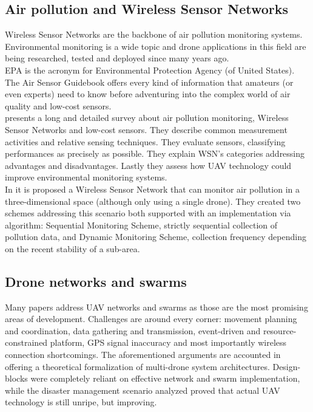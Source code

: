 \documentclass[journal]{IEEEtran}
\begin{document}
\subsection{Air pollution and Wireless Sensor Networks}
Wireless Sensor Networks are the backbone of air pollution monitoring systems. Environmental monitoring is a wide topic and drone applications in this field are being researched, tested and deployed since many years ago.
\\
EPA\cite{epa} is the acronym for Environmental Protection Agency (of United States). The Air Sensor Guidebook \cite{epaguide} offers every kind of information that amateurs (or even experts) need to know before adventuring into the complex world of air quality and low-cost sensors.
\\
\cite{wsnsurvey} presents a long and detailed survey about air pollution monitoring, Wireless Sensor Networks and low-cost sensors. They describe common measurement activities and relative sensing techniques. They evaluate sensors, classifying performances as precisely as possible. They explain WSN's categories addressing advantages and disadvantages. Lastly they assess how UAV technology could improve environmental monitoring systems.
\\
In \cite{airwise} it is proposed a Wireless Sensor Network that can monitor air pollution in a three-dimensional space (although only using a single drone). They created two schemes addressing this scenario both supported with an implementation via algorithm: Sequential Monitoring Scheme, strictly sequential collection of pollution data, and Dynamic Monitoring Scheme, collection frequency depending on the recent stability of a sub-area.

\subsection{Drone networks and swarms}
Many papers address UAV networks and swarms as those are the most promising areas of development. Challenges are around every corner: movement planning and coordination, data gathering and transmission, event-driven and resource-constrained platform, GPS signal inaccuracy and most importantly wireless connection shortcomings. The aforementioned arguments are accounted in \cite{netwcivil} offering a theoretical formalization of multi-drone system architectures. Design-blocks were completely reliant on effective network and swarm implementation, while the disaster management scenario analyzed proved that actual UAV technology is still unripe, but improving.
\end{document}
